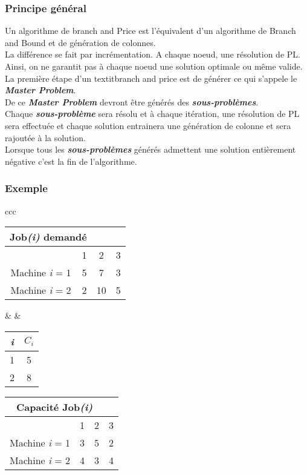 \subsubsection{Principe général}
Un algorithme de branch and Price est l'équivalent d'un algorithme de Branch and Bound et de génération de colonnes. \\
La différence se fait par incrémentation. A chaque noeud, une résolution de PL. Ainsi, on ne garantit pas à chaque noeud une solution optimale ou même valide. 
\\
La première étape d'un textit{branch and price} est de générer ce qui s'appele le \textbf{\textit{Master Problem}}.\\
De ce \textbf{\textit{Master Problem}} devront être générés des \textbf{\textit{sous-problèmes}}. \\
Chaque \textbf{\textit{sous-problème}} sera résolu et à chaque itération, une résolution de PL sera effectuée et chaque solution entrainera une génération de colonne et sera rajoutée à la solution. \\
Lorsque tous les \textbf{\textit{sous-problèmes}} générés admettent une solution entièrement négative c'est la fin de l'algorithme.


\subsubsection{Exemple}
\begin{center}
\begin{tabular}{ ccc}
\begin{tabular}{  c c c c}
\hline
\multicolumn{2}{c}{\textbf{Job}\textit{(i)} demandé} \\
\hline
 & 1 & 2 & 3 \\
 \hline
Machine \textit{i} = 1 & 5 & 7 & 3 \\
Machine \textit{i} = 2 & 2 & 10 & 5 \\
\hline
\end{tabular}

& &
\begin{tabular}{c c}
\hline
\textit{i} & $C_\textit{i}$\\
\hline
1 & 5 \\
\hline
2 & 8\\
\hline
\end{tabular}


\begin{tabular}{  c c c c}
\hline
\multicolumn{3}{c}{Capacité \textbf{Job}\textit{(i)}} \\
\hline
 & 1 & 2 & 3 \\
 \hline
Machine \textit{i} = 1 & 3 & 5 & 2 \\
Machine \textit{i} = 2 & 4 & 3 & 4 \\
\hline
\end{tabular}

\end{tabular}
\end{center}
\vspace{1cm}

